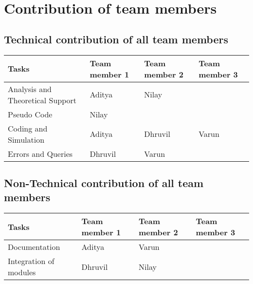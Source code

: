 \documentclass{article}
\begin{document}
\newpage
\section{ Contribution of team members}	
\subsection{Technical contribution of all team members }
\begin{table}[h]
\centering
\begin{tabular}{|l|l|l|l|}
    \hline
    Tasks  & Team member 1 & Team member 2 & Team member 3 \\ \hline
    Analysis and Theoretical Support & Aditya & Nilay & \\ \hline
    Pseudo Code & Nilay & & \\ \hline
    Coding and Simulation & Aditya & Dhruvil & Varun \\ \hline
    Errors and Queries & Dhruvil & Varun & \\ \hline
\end{tabular}
\end{table}

\subsection{Non-Technical contribution of all team members }
\begin{table}[h]
\centering
\begin{tabular}{|l|l|l|l|}
    \hline
    Tasks  & Team member 1 & Team member 2 & Team member 3 \\ \hline
    Documentation & Aditya & Varun & \\ \hline
    Integration of modules  & Dhruvil & Nilay & \\ \hline
\end{tabular}
\end{table}



\end{document}
